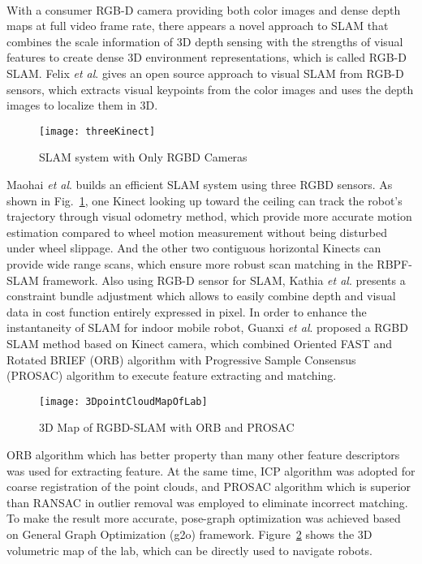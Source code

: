 \\\indent
With a consumer RGB-D camera providing both color images and dense depth maps at full video frame rate, there appears a novel approach to SLAM that combines the scale information of 3D depth sensing with the strengths of visual features to create dense 3D environment representations, which is called RGB-D SLAM. Felix \textit{et al}. \cite{RGBDSLAM01_2012} gives an open source approach to visual SLAM from RGB-D sensors, which extracts visual keypoints from the color images and uses the depth images to localize them in 3D. %
%
\begin{figure}[t]
\centering
\texttt{[image: threeKinect]}
\caption{SLAM system with Only RGBD Cameras \cite{RGBDSLAMsystem_2013}}
\label{threeKinect}
\end{figure}%
%
Maohai \textit{et al}. \cite{RGBDSLAMsystem_2013} builds an efficient SLAM system using three RGBD sensors. As shown in Fig.~\ref{threeKinect}, one Kinect looking up toward the ceiling can track the robot's trajectory through visual odometry method, which provide more accurate motion estimation compared to wheel motion measurement without being disturbed under wheel slippage. And the other two contiguous horizontal Kinects can provide wide range scans, which ensure more robust scan matching in the RBPF-SLAM framework. Also using RGB-D sensor for SLAM, Kathia \textit{et al}. \cite{bundleSLAMRGBD_2015} presents a constraint bundle adjustment which allows to easily combine depth and visual data in cost function entirely expressed in pixel. In order to enhance the instantaneity of SLAM for indoor mobile robot, Guanxi \textit{et al}. \cite{indorRGBDSLAM_2015} proposed a RGBD SLAM method based on Kinect camera, which combined Oriented FAST and Rotated BRIEF (ORB) algorithm with Progressive Sample Consensus (PROSAC) algorithm to execute feature extracting and matching. %
%
%
\begin{figure}[b]
\centering
\texttt{[image: 3DpointCloudMapOfLab]}
\caption{3D Map of RGBD-SLAM with ORB and PROSAC \cite{indorRGBDSLAM_2015}}
\label{3DpointCloudMapOfLab}
\end{figure}%
%
ORB algorithm which has better property than many other feature descriptors was used for extracting feature. At the same time, ICP algorithm was adopted for coarse registration of the point clouds, and PROSAC algorithm which is superior than RANSAC in outlier removal was employed to eliminate incorrect matching. To make the result more accurate, pose-graph optimization was achieved based on General Graph Optimization (g2o) framework. Figure~\ref{3DpointCloudMapOfLab} shows the 3D volumetric map of the lab, which can be directly used to navigate robots.
